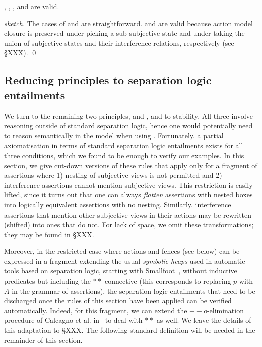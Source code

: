 \begin{lemma}
  \label{lem:assertion-facts}
  \forgetRule, \mergeRule, \weakenRule, and \copyRule are valid.
\end{lemma}
\begin{proof}[sketch]
  The cases of \weakenRule and \copyRule are
  straightforward. \forgetRule and \mergeRule are valid because action
  model closure is preserved under picking a sub-subjective state and
  under taking the union of subjective states and their interference
  relations, respectively (see \S XXX).
  \qed
\end{proof}


\subsection{Reducing \colosl principles to separation logic entailments}
\label{sec:prules}

We turn to the remaining two principles, \extendRule and \shiftRule,
and to stability. All three involve reasoning outside of standard
separation logic, hence one would potentially need to reason
semantically in the model when using \colosl. Fortunately, a partial
axiomatisation in terms of standard separation logic entailments
exists for all three conditions, which we found to be enough to verify
our examples. In this section, we give cut-down versions of these
rules that apply only for a fragment of \colosl assertions where 1)
nesting of subjective views is not permitted and 2) interference
assertions cannot mention subjective views. This restriction is easily
lifted, since it turns out that one can always \emph{flatten}
assertions with nested boxes into logically equivalent assertions with
no nesting. Similarly, interference assertions that mention other
subjective views in their actions may be rewritten (shifted) into ones
that do not. For lack of space, we omit these transformations; they
may be found in \S XXX.

Moreover, in the restricted case where actions and fences (see below)
can be expressed in a fragment extending the usual \emph{symbolic
  heaps} used in automatic tools based on separation logic, starting
with Smallfoot~\cite{smallfoot}, without inductive predicates but
including the $**$ connective (this corresponds to replacing $p$ with
$A$ in the grammar of assertions), the separation logic entailments
that need to be discharged once the rules of this section have been
applied can be verified automatically. Indeed, for this fragment, we
can extend the $--o$-elimination procedure of Calcagno et
al. in~\cite{vv07msc} to deal with $**$ as well. We leave the details
of this adaptation to \S XXX. The following standard definition will
be needed in the remainder of this section.

